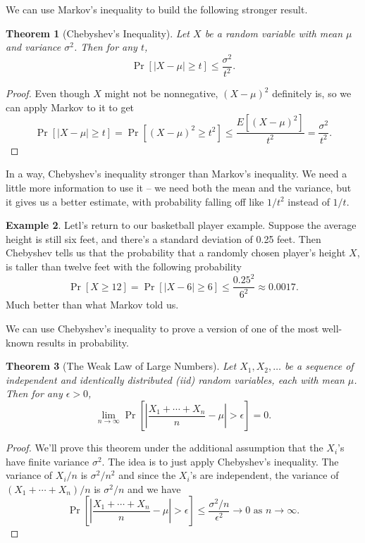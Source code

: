 \documentclass[12pt]{article}
\theoremstyle{plain}
\newtheorem{theorem}{Theorem}[section]
\theoremstyle{definition}
\newtheorem{example}[theorem]{Example}
\theoremstyle{remark}
\begin{document}
We can use Markov's inequality to build the following stronger result.
\begin{theorem}[Chebyshev's Inequality]
    Let $X$ be a random variable with mean $\mu$ and variance $\sigma^2$.
    Then for any $t$,
    \[
        \Pr[|X-\mu| \geq t] \leq \frac{\sigma^2}{t^2}.
    \]
\end{theorem}
\begin{proof}
    Even though $X$ might not be nonnegative, $(X-\mu)^2$ definitely is, so we can apply Markov to it to get
    \[
        \Pr[|X-\mu| \geq t] = \Pr[(X-\mu)^2 \geq t^2] \leq \frac{E[(X-\mu)^2]}{t^2} = \frac{\sigma^2}{t^2}.
    \]
\end{proof}
In a way, Chebyshev's inequality stronger than Markov's inequality.
We need a little more information to use it -- we need both the mean and the variance, but it gives us a better estimate, with probability falling off like $1/t^2$ instead of $1/t$.

\begin{example}
    Letl's return to our basketball player example.
    Suppose the average height is still six feet, and there's a standard deviation of 0.25 feet.
    Then Chebyshev tells us that the probability that a randomly chosen player's height $X$, is taller than twelve feet with the following probability
    \[
        \Pr[X \geq 12] = \Pr[|X-6|\geq 6] \leq \frac{0.25^2}{6^2}\approx 0.0017.
    \]
    Much better than what Markov told us.
\end{example}

We can use Chebyshev's inequality to prove a version of one of the most well-known results in probability.

\begin{theorem}[The Weak Law of Large Numbers]
    Let $X_1, X_2, \ldots$ be a sequence of independent and identically distributed (iid) random variables, each with mean $\mu$.
    Then for any $\epsilon>0$,
    \[
        \lim_{n\to \infty}\Pr\left[\left|\frac{X_1 + \cdots + X_n}{n}-\mu\right| >\epsilon \right] = 0.
    \]
\end{theorem}
\begin{proof}
    We'll prove this theorem under the additional assumption that the $X_i$'s have finite variance $\sigma^2$.
    The idea is to just apply Chebyshev's inequality.
    The variance of $X_i/n$ is $\sigma^2/n^2$ and since the $X_i$'s are independent, the variance of $(X_1 + \cdots + X_n)/n$ is $\sigma^2/n$ and we have
    \[
        \Pr\left[\left|\frac{X_1 + \cdots + X_n}{n}-\mu\right| >\epsilon \right]\leq \frac{\sigma^2/n}{\epsilon^2}\to 0\text{ as }n\to \infty.
    \]
\end{proof}
\end{document}
